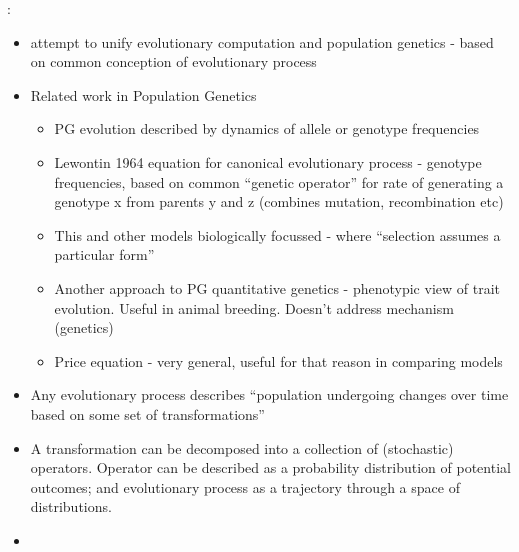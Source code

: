 \autocite{Paixao2015}:

\begin{itemize}
	\item
	
	attempt to unify evolutionary computation and population genetics -
	based on common conception of evolutionary process
	
	\item
	
	Related work in Population Genetics
	
	
	\begin{itemize}
		\item
		
		PG evolution described by dynamics of allele or genotype frequencies
		
		\item
		
		Lewontin 1964 equation for canonical evolutionary process - genotype
		frequencies, based on common ``genetic operator'' for rate of
		generating a genotype x from parents y and z (combines mutation,
		recombination etc)
		
		\item
		
		This and other models biologically focussed - where ``selection
		assumes a particular form''
		
		\item
		
		Another approach to PG quantitative genetics - phenotypic view of
		trait evolution. Useful in animal breeding. Doesn't address
		mechanism (genetics)
		
		\item
		
		Price equation - very general, useful for that reason in comparing
		models
		
	\end{itemize}
	\item
	
	Any evolutionary process describes ``population undergoing changes
	over time based on some set of transformations''
	
	\item
	
	A transformation can be decomposed into a collection of (stochastic)
	operators. Operator can be described as a probability distribution of
	potential outcomes; and evolutionary process as a trajectory through a
	space of distributions.
	
	\item
	

\end{itemize}
